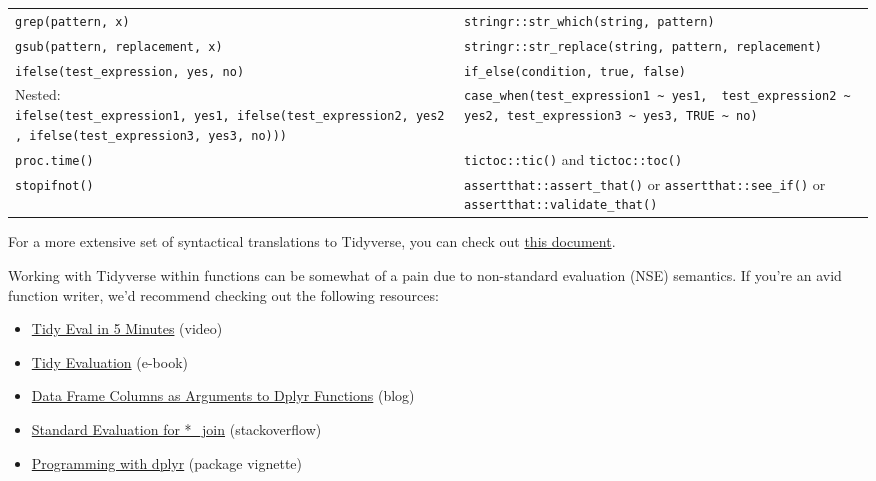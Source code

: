 \documentclass[
]{book}
\providecommand{\tightlist}{%
  \setlength{\itemsep}{0pt}\setlength{\parskip}{0pt}}
\begin{document}
\begin{longtable}[]{@{}
  >{\raggedright\arraybackslash}p{}
  >{\raggedright\arraybackslash}p{}@{}}
\texttt{grep(pattern,\ x)} & \texttt{stringr::str\_which(string,\ pattern)} \\
\texttt{gsub(pattern,\ replacement,\ x)} & \texttt{stringr::str\_replace(string,\ pattern,\ replacement)} \\
\texttt{ifelse(test\_expression,\ yes,\ no)} & \texttt{if\_else(condition,\ true,\ false)} \\
Nested: \texttt{ifelse(test\_expression1,\ yes1,\ ifelse(test\_expression2,\ yes2,\ ifelse(test\_expression3,\ yes3,\ no)))} & \texttt{case\_when(test\_expression1\ \textasciitilde{}\ yes1,\ \ test\_expression2\ \textasciitilde{}\ yes2,\ test\_expression3\ \textasciitilde{}\ yes3,\ TRUE\ \textasciitilde{}\ no)} \\
\texttt{proc.time()} & \texttt{tictoc::tic()} and \texttt{tictoc::toc()} \\
\texttt{stopifnot()} & \texttt{assertthat::assert\_that()} or \texttt{assertthat::see\_if()} or \texttt{assertthat::validate\_that()} \\
\end{longtable}

For a more extensive set of syntactical translations to Tidyverse, you can check out \href{https://tavareshugo.github.io/data_carpentry_extras/base-r_tidyverse_equivalents/base-r_tidyverse_equivalents.html\#reshaping_data}{this document}.

Working with Tidyverse within functions can be somewhat of a pain due to non-standard evaluation (NSE) semantics. If you're an avid function writer, we'd recommend checking out the following resources:

\begin{itemize}
\tightlist
\item
  \href{https://www.youtube.com/watch?v=nERXS3ssntw}{Tidy Eval in 5 Minutes} (video)
\item
  \href{https://tidyeval.tidyverse.org/index.html}{Tidy Evaluation} (e-book)
\item
  \href{https://www.brodrigues.co/blog/2016-07-18-data-frame-columns-as-arguments-to-dplyr-functions/}{Data Frame Columns as Arguments to Dplyr Functions} (blog)
\item
  \href{https://stackoverflow.com/questions/28125816/r-standard-evaluation-for-join-dplyr}{Standard Evaluation for *\_join} (stackoverflow)
\item
  \href{https://dplyr.tidyverse.org/articles/programming.html}{Programming with dplyr} (package vignette)
\end{itemize}
\end{document}

